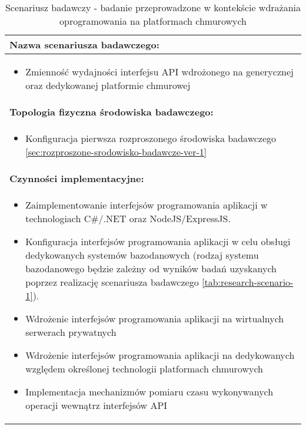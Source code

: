\setlength{\LTcapwidth}{\textwidth}
\setlength\LTleft{0pt}
\setlength\LTright{0pt}
\begin{longtable}[c]{|llll|}
    \caption{Scenariusz badawczy - badanie przeprowadzone w kontekście wdrażania oprogramowania na platformach chmurowych}
    \label{tab:research-scenario-6}                                                  \\ \hline
    \multicolumn{4}{|l|}{\textbf{Nazwa scenariusza badawczego:}}                     \\ \hline
    \multicolumn{4}{|p{\linewidth}|}{
        \begin{itemize}[label={}]
            \item Zmienność wydajności interfejsu API wdrożonego na generycznej oraz dedykowanej platformie chmurowej
          \end{itemize}
    } \\ \hline
    \multicolumn{4}{|l|}{\textbf{Topologia fizyczna środowiska badawczego:}}         \\ \hline
    \multicolumn{4}{|p{\linewidth}|}{
        \begin{itemize}[label={}]
            \item Konfiguracja pierwsza rozproszonego środowiska badawczego \ref{sec:rozproszone-srodowisko-badawcze-ver-1}
          \end{itemize}
    }\\ \hline
    \multicolumn{4}{|l|}{\textbf{Czynności implementacyjne:}}                        \\ \hline
    \multicolumn{4}{|p{\linewidth}|}{
        \begin{itemize}
            \item Zaimplementowanie interfejsów programowania aplikacji w technologiach C\#/.NET oraz NodeJS/ExpressJS.
            \item Konfiguracja interfejsów programowania aplikacji w celu obsługi dedykowanych systemów bazodanowych (rodzaj systemu bazodanowego będzie zależny od wyników badań uzyskanych poprzez realizację scenariusza badawczego \ref{tab:research-scenario-1}).
            \item Wdrożenie interfejsów programowania aplikacji na wirtualnych serwerach prywatnych
            \item Wdrożenie interfejsów programowania aplikacji na dedykowanych względem określonej technologii platformach chmurowych
            \item Implementacja mechanizmów pomiaru czasu wykonywanych operacji wewnątrz interfejsów API

\end{itemize}}
\end{longtable}
